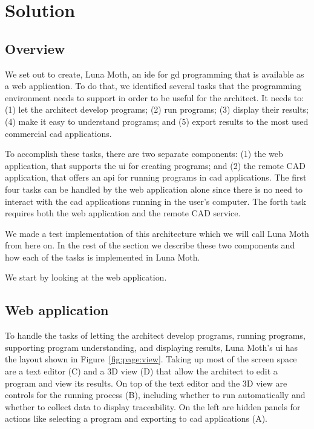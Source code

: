 
\section{Solution}
\label{sec:solution}


\subsection{Overview}
We set out to create, Luna Moth, an \gls{ide} for \gls{gd} programming that is available as a web application.
To do that, we identified several tasks that the programming environment needs to support in order to be useful for the architect.
It needs to:
(1) let the architect develop programs;
(2) run programs;
(3) display their results;
(4) make it easy to understand programs;
and (5) export results to the most used commercial \gls{cad} applications.

To accomplish these tasks, there are two separate components: (1) the web application, that supports the \gls{ui} for creating programs;  and (2) the remote CAD application, that offers an \gls{api} for running programs in \gls{cad} applications.
The first four tasks can be handled by the web application alone since there is no need to interact with the \gls{cad} applications running in the user's computer.
The forth task requires both the web application and the remote CAD service.

We made a test implementation of this architecture which we will call Luna Moth from here on.
In the rest of the section we describe these two components and how each of the tasks is implemented in Luna Moth.

We start by looking at the web application.


\subsection{Web application}
To handle the tasks of letting the architect develop programs, running programs, supporting program understanding, and displaying results, Luna Moth's \gls{ui} has the layout shown in Figure~\ref{fig:page:view}.
Taking up most of the screen space are a text editor (C) and a 3D view (D) that allow the architect to edit a program and view its results.
On top of the text editor and the 3D view are controls for the running process (B), including whether to run automatically and whether to collect data to display traceability.
On the left are hidden panels for actions like selecting a program and exporting to \gls{cad} applications (A).

